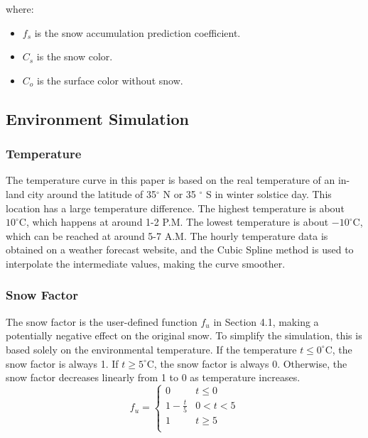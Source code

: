 \documentclass{article}
\begin{document}
where:
\begin{itemize}
  \item \( f_{s} \) is the snow accumulation prediction coefficient.
  \item \( C_{s} \) is the snow color.
  \item \( C_{o} \) is the surface color without snow.
\end{itemize}

\subsection {Environment Simulation}

\subsubsection {Temperature}
The temperature curve in this paper is based on the real temperature of an in-land city around the latitude of 35$^{\circ}$ N or 35
$^{\circ}$ S in winter solstice day. This location has a large temperature difference. The highest temperature is about 
\(10^\circ\mathrm{C}\), which happens at around 1-2 P.M. The lowest temperature is about \(-10^\circ\mathrm{C}\), which can be reached 
at around 5-7 A.M. The hourly temperature data is obtained on a weather forecast website, and the Cubic Spline method is used to 
interpolate the intermediate values, making the curve smoother.

\subsubsection {Snow Factor}
The snow factor is the user-defined function \( f_{u} \) in Section 4.1, making a potentially negative effect on the original snow. To 
simplify the simulation, this is based solely on the environmental temperature. If the temperature \( t \leq 0^\circ\mathrm{C}\), the 
snow factor is always 1. If \( t \geq 5^\circ\mathrm{C}\), the snow factor is always 0. Otherwise, the snow factor decreases linearly 
from 1 to 0 as temperature increases.
\[
  f_{u}=
  \left\{
    \begin{array}{ll}
      0 & t\leq 0 \\
      1 - \frac{t}{5} &  0 < t < 5 \\
      1 & t\geq 5 \\
    \end{array} 
  \right. 
\]
\end{document}
